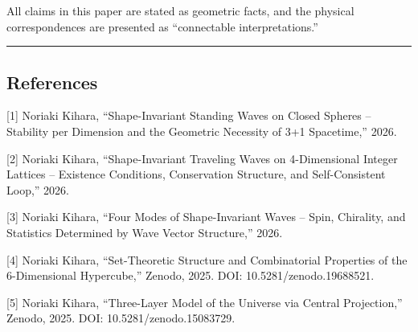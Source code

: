 \documentclass[
  a4paper,11pt]{article}
\theoremstyle{definition}
\theoremstyle{remark}
\begin{document}
All claims in this paper are stated as geometric facts, and the physical
correspondences are presented as ``connectable interpretations.''

\begin{center}\rule{0.5\linewidth}{0.5pt}\end{center}

\subsection{References}\label{references}

{[}1{]} Noriaki Kihara, ``Shape-Invariant Standing Waves on Closed
Spheres -- Stability per Dimension and the Geometric Necessity of 3+1
Spacetime,'' 2026.

{[}2{]} Noriaki Kihara, ``Shape-Invariant Traveling Waves on
4-Dimensional Integer Lattices -- Existence Conditions, Conservation
Structure, and Self-Consistent Loop,'' 2026.

{[}3{]} Noriaki Kihara, ``Four Modes of Shape-Invariant Waves -- Spin,
Chirality, and Statistics Determined by Wave Vector Structure,'' 2026.

{[}4{]} Noriaki Kihara, ``Set-Theoretic Structure and Combinatorial
Properties of the 6-Dimensional Hypercube,'' Zenodo, 2025. DOI:
10.5281/zenodo.19688521.

{[}5{]} Noriaki Kihara, ``Three-Layer Model of the Universe via Central
Projection,'' Zenodo, 2025. DOI: 10.5281/zenodo.15083729.
\end{document}
